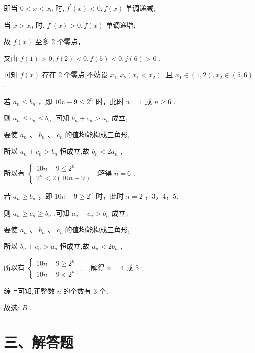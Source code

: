 \documentclass[10pt]{article}
\newcommand*\circled[1]{\tikz[baseline=(char.base)]{\node[shape=circle,draw,inner sep=1.5pt] (char) {\small #1};}}
\begin{document}
即当 \(0 < x < {x}_{0}\) 时, \({f}^{\prime }\left( x\right)  < 0,f\left( x\right)\) 单调递减;

当 \(x > {x}_{0}\) 时, \({f}^{\prime }\left( x\right)  > 0,f\left( x\right)\) 单调递增;

故 \(f\left( x\right)\) 至多 2 个零点，

又由 \(f\left( 1\right)  > 0,f\left( 2\right)  < 0,f\left( 5\right)  < 0,f\left( 6\right)  > 0\) ,

可知 \(f\left( x\right)\) 存在 2 个零点,不妨设 \({x}_{1},{x}_{2}\left( {{x}_{1} < {x}_{2}}\right)\) ,且 \({x}_{1} \in  \left( {1,2}\right) ,{x}_{2} \in  \left( {5,6}\right)\) .

 \circled{1} 若 \({a}_{n} \leq  {b}_{n}\) ，即 \({10n} - 9 \leq  {2}^{n}\) 时，此时 \(n = 1\) 或 \(n \geq  6\) .

则 \({a}_{n} \leq  {c}_{n} \leq  {b}_{n}\) ,可知 \({b}_{n} + {c}_{n} > {a}_{n}\) 成立,

要使 \({a}_{n}\text{ 、 }{b}_{n}\text{ 、 }{c}_{n}\) 的值均能构成三角形,

所以 \({a}_{n} + {c}_{n} > {b}_{n}\) 恒成立,故 \({b}_{n} < 2{a}_{n}\) ,

所以有 \(\left\{  \begin{array}{l} {10n} - 9 \leq  {2}^{n} \\  {2}^{n} < 2\left( {{10n} - 9}\right)  \end{array}\right.\) ,解得 \(n = 6\) ;

 \circled{2} 若 \({a}_{n} \geq  {b}_{n}\) ，即 \({10n} - 9 \geq  {2}^{n}\) 时，此时 \(n = 2\) ，3，4，5.

则 \({a}_{n} \geq  {c}_{n} \geq  {b}_{n}\) ,可知 \({a}_{n} + {c}_{n} > {b}_{n}\) 成立，

要使 \({a}_{n}\text{ 、 }{b}_{n}\text{ 、 }{c}_{n}\) 的值均能构成三角形,

所以 \({b}_{n} + {c}_{n} > {a}_{n}\) 恒成立,故 \({a}_{n} < 2{b}_{n}\) ,

所以有 \(\left\{  \begin{array}{l} {10n} - 9 \geq  {2}^{n} \\  {10n} - 9 < {2}^{n + 1} \end{array}\right.\) ,解得 \(n = 4\) 或 5 ;

综上可知,正整数 \(n\) 的个数有 3 个.

故选: \(B\) .

\section*{三、解答题}
\end{document}
